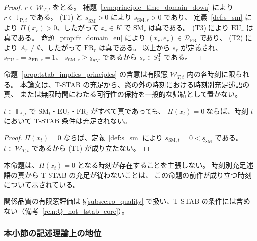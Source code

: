 \begin{proof}
$r\in\mathcal{W}_{T,t}$ をとる。
補題~\ref{lem:principle_time_domain_down} により $r\in\mathbb{T}_{\mathrm{P},i}$ である。
(T1) と $\underline{s}_{\mathrm{SM}}>0$ により $s_{\mathrm{SM},r}>0$ であり、
定義~\ref{def:s_sm} により $\Pi(x_r)>0$、したがって $x_r\in K$ で $\mathrm{SM}_r$ は真である。
(T3) により $\mathrm{EU}_r$ は真である。
命題~\ref{prop:fr_domain_eu} により $(x_r,e_r)\in\mathcal{D}_{\mathrm{FR}}$ であり、
(T2) により $A_r\neq\emptyset$、したがって $\mathrm{FR}_r$ は真である。
以上から $s_r$ が定義され、$s_{\mathrm{EU},r}=s_{\mathrm{FR},r}=1$、
$s_{\mathrm{SM},r}\ge\underline{s}_{\mathrm{SM}}$ であるから $s_r\in S_3^{\mathrm T}$ である。
\end{proof}

命題~\ref{prop:tstab_implies_principles} の含意は有限窓 $\mathcal{W}_{T,t}$ 内の各時刻に限られる。
本論文は、T-STAB の充足から、窓の外の時刻における時刻別充足述語の真、
または無限時間にわたる可行性の保持を一般的な帰結として置かない。

\begin{proposition}
\label{prop:tstab_zero_margin}
$t\in\mathbb{T}_{\mathrm{P},i}$ で $\mathrm{SM}_t$・$\mathrm{EU}_t$・$\mathrm{FR}_t$ がすべて真であっても、
$\Pi(x_t)=0$ ならば、時刻 $t$ において T-STAB 条件は充足されない。
\end{proposition}

\begin{proof}
$\Pi(x_t)=0$ ならば、定義~\ref{def:s_sm} により $s_{\mathrm{SM},t}=0<\underline{s}_{\mathrm{SM}}$ である。
$t\in\mathcal{W}_{T,t}$ であるから (T1) が成り立たない。
\end{proof}

本命題は、$\Pi(x_t)=0$ となる時刻が存在することを主張しない。
時刻別充足述語の真から T-STAB の充足が従わないことは、
この命題の前件が成り立つ時刻について示されている。

関係品質の有限窓評価は \S\ref{subsec:ro_quality} で扱い、T-STAB の条件には含めない（備考~\ref{rem:Q_not_tstab_core}）。

\subsubsection{本小節の記述理論上の地位}

